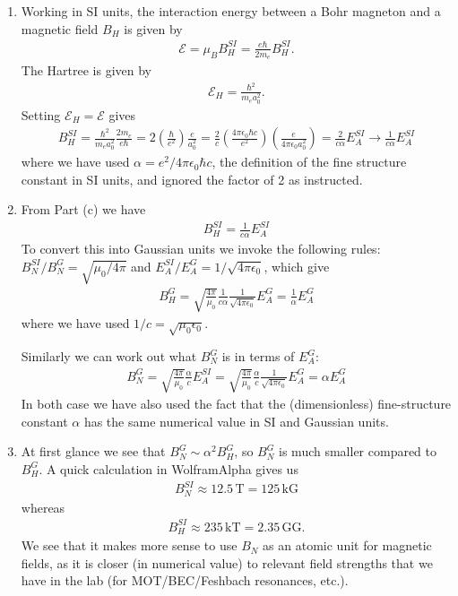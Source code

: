 \documentclass{book}
\theoremstyle{definition}
\newcommand{\al}{\alpha}
\newcommand{\f}[2]{\frac{#1}{#2}}
\newcommand{\lp}{\left(}
\newcommand{\rp}{\right)}
\begin{document}
\begin{enumerate}[label=\alph*)]
	
	
	\item Working in SI units, the interaction energy between a Bohr magneton and a magnetic field $B_H$ is given by 
	\begin{align*}
		\mathcal{E} = \mu_B B^{SI}_H = \f{e \hbar}{2 m_e} B_H^{SI}.
	\end{align*}
	The Hartree is given by 
	\begin{align*}
		\mathcal{E}_H = \f{\hbar^2}{m_e a_0^2}.
	\end{align*}
	Setting $\mathcal{E}_H = \mathcal{E}$ gives
	\begin{align*}
		B_H^{SI} = \f{\hbar^2}{m_ea_0^2} \f{2m_e}{e\hbar} = 2\lp \f{\hbar}{e^2} \rp \f{e}{a_0^2} = \f{2}{c}\lp \f{4\pi \epsilon_0 \hbar c}{e^2} \rp \lp \f{e}{4\pi \epsilon_0 a_0^2} \rp = \f{2}{c\al} E_A^{SI} \to \boxed{\f{1}{c\al} E_A^{SI}}
	\end{align*} 
	where we have used $\al = e^2/4\pi \epsilon_0 \hbar c$, the definition of the fine structure constant in SI units, and ignored the factor of 2 as instructed. 
	
	
	\item From Part (c) we have
	\begin{align*}
		B_H^{SI} =  \f{1}{c\al} E_A^{SI} 
	\end{align*}
	To convert this into Gaussian units we invoke the following rules: $B^{SI}_N/B^G_N = \sqrt{\mu_0/4\pi}$ and $E_A^{SI}/E^G_A = 1/\sqrt{4\pi\epsilon_0}$, which give
	\begin{align*}
		\boxed{B_H^{G}} = \sqrt{\f{4\pi}{\mu_0}} \f{1}{c\al} \f{1}{\sqrt{4\pi \epsilon_0}} E_A^{G} = \boxed{\f{1}{\al} E_A^G}
	\end{align*}
	where we have used $1/c = \sqrt{\mu_0 \epsilon_0}$.
	
	
	Similarly we can work out what $B_N^{G}$ is in terms of $E_A^{G}$:
	\begin{align*}
		\boxed{B^G_{N}}= \sqrt{\f{4\pi}{\mu_0}} \f{\al}{c}E_A^{SI} = \sqrt{\f{4\pi}{\mu_0}} \f{\al}{c} \f{1}{\sqrt{4\pi \epsilon_0}} E_A^G = \boxed{\al E_A^G}
	\end{align*}
	In both case we have also used the fact that the (dimensionless) fine-structure constant $\al$ has the same numerical value in SI and Gaussian units.
	
	
	
	\item At first glance we see that $B_N^G \sim \al^2 B_H^G$, so $B_N^G$ is much smaller compared to $B_H^G$. A quick calculation in WolframAlpha gives us 
	\begin{align*}
		B_N^{SI} \approx 12.5\, \text{T} = 125 \, \text{kG}
	\end{align*}
	whereas 
	\begin{align*}
		B_H^{SI} \approx 235 \, \text{kT} = 2.35 \, \text{GG}.
	\end{align*}
	We see that it makes more sense to use $B_N$ as an atomic unit for magnetic fields, as it is closer (in numerical value) to relevant field strengths that we have in the lab (for MOT/BEC/Feshbach resonances, etc.).
\end{enumerate}
\end{document}
